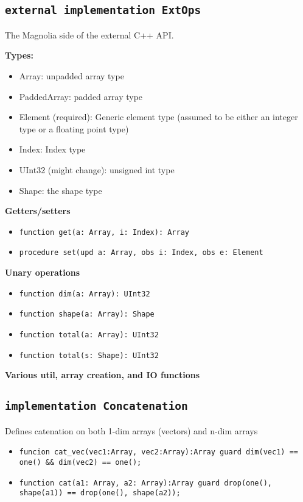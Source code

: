 \documentclass{article}
\begin{document}
\subsection{\texttt{external implementation ExtOps}}
\noindent The Magnolia side of the external C++ API.

\noindent \textbf{Types:}
\begin{itemize}
    \item Array: unpadded array type
    \item PaddedArray: padded array type
    \item Element (required): Generic element type (assumed to be either an integer type or a floating point type)
    \item Index: Index type
    \item UInt32 (might change): unsigned int type
    \item Shape: the shape type
\end{itemize}
\noindent \textbf{Getters/setters}
\begin{itemize}
    \item \texttt{function get(a: Array, i: Index): Array}
    \item \texttt{procedure set(upd a: Array, obs i: Index, obs e: Element}
\end{itemize}
\noindent \textbf{Unary operations}
\begin{itemize}
    \item \texttt{function dim(a: Array): UInt32}
    \item \texttt{function shape(a: Array): Shape}
    \item \texttt{function total(a: Array): UInt32}
    \item \texttt{function total(s: Shape): UInt32}

\end{itemize}
\noindent \textbf{Various util, array creation, and IO functions}
\subsection{\texttt{implementation Concatenation}}
\noindent Defines catenation on both 1-dim arrays (vectors) and n-dim arrays
\begin{itemize}
    \item \texttt{funcion cat\_vec(vec1:Array, vec2:Array):Array guard dim(vec1) == one() \&\& dim(vec2) == one();}
    \item \texttt{function cat(a1: Array, a2: Array):Array guard drop(one(), shape(a1)) == drop(one(), shape(a2));  }
\end{itemize}
\end{document}
